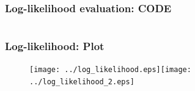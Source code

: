 \documentclass[aspectratio=169]{beamer}\usepackage[utf8]{inputenc}
\begin{document}
\begin{frame}\frametitle{Log-likelihood evaluation: CODE}

\begin{center}
\begin{tabular}{|c|}
\toprule
{\tiny

}\\
\bottomrule
\end{tabular}
\end{center}

\end{frame}


\begin{frame}\frametitle{Log-likelihood: Plot}

\begin{figure}[ht!]
\centering
\texttt{[image: ../log\_likelihood.eps]}\quad\texttt{[image: ../log\_likelihood\_2.eps]}
\end{figure}

\end{frame}
\end{document}
